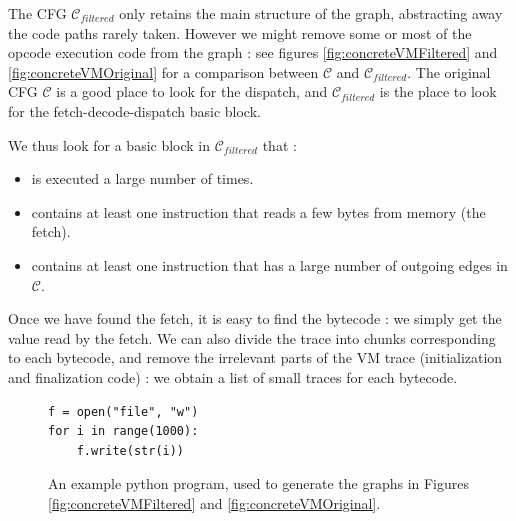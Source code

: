 \documentclass[french]{article}
\begin{document}
The CFG $\mathcal{C}_{filtered}$ only retains the main structure of the graph, abstracting away the code paths rarely taken. However we might remove some or most of the opcode execution code from the graph : see figures \ref{fig:concreteVMFiltered} and \ref{fig:concreteVMOriginal} for a comparison between $\mathcal{C}$ and $\mathcal{C}_{filtered}$. The original CFG $\mathcal{C}$ is a good place to look for the dispatch, and $\mathcal{C}_{filtered}$ is the place to look for the fetch-decode-dispatch basic block. 

We thus look for a basic block in $\mathcal{C}_{filtered}$ that :
\begin{itemize}
	\item is executed a large number of times.
	\item contains at least one instruction that reads a few bytes from memory (the fetch).
	\item contains at least one instruction that has a large number of outgoing edges in $\mathcal{C}$.
\end{itemize}

Once we have found the fetch, it is easy to find the bytecode : we simply get the value read by the fetch. We can also divide the trace into chunks corresponding to each bytecode, and remove the irrelevant parts of the VM trace (initialization and finalization code) : we obtain a list of small traces for each bytecode.

\begin{figure}[htp]
	\centering 
	\begin{BVerbatim}
f = open("file", "w")
for i in range(1000):
	f.write(str(i))
	\end{BVerbatim}
	\caption{An example python program, used to generate the graphs in Figures 	\ref{fig:concreteVMFiltered} and \ref{fig:concreteVMOriginal}.}
	\label{fig:examplePythonProg}
\end{figure}
\end{document}
